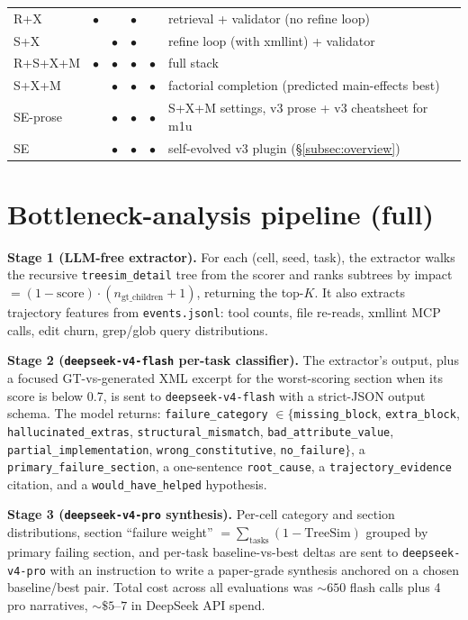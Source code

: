 \documentclass{article}
\begin{document}
\begin{table}[h]
\begin{tabular}{lccccl}
    R+X & $\bullet$ &         & $\bullet$ &         & retrieval + validator (no refine loop)                 \\
    S+X &         & $\bullet$ & $\bullet$ &         & refine loop (with xmllint) + validator                 \\
    R+S+X+M & $\bullet$ & $\bullet$ & $\bullet$ & $\bullet$ & full stack                                     \\
    \midrule
    S+X+M    &         & $\bullet$ & $\bullet$ & $\bullet$ & factorial completion (predicted main-effects best) \\
    SE-prose &         & $\bullet$ & $\bullet$ & $\bullet$ & S+X+M settings, v3 prose + v3 cheatsheet for m1u   \\
    SE       &         & $\bullet$ & $\bullet$ & $\bullet$ & self-evolved v3 plugin (\S\ref{subsec:overview})   \\
    \bottomrule
  \end{tabular}
\end{table}

\section{Bottleneck-analysis pipeline (full)}
\label{app:bottleneck}

\textbf{Stage 1 (LLM-free extractor).} For each (cell, seed, task), the extractor walks the recursive \texttt{treesim\_detail} tree from the scorer and ranks subtrees by impact $= (1 - \mathrm{score}) \cdot (n_{\mathrm{gt\_children}} + 1)$, returning the top-$K$. It also extracts trajectory features from \texttt{events.jsonl}: tool counts, file re-reads, xmllint MCP calls, edit churn, grep/glob query distributions.

\textbf{Stage 2 (\texttt{deepseek-v4-flash} per-task classifier).} The extractor's output, plus a focused GT-vs-generated XML excerpt for the worst-scoring section when its score is below 0.7, is sent to \texttt{deepseek-v4-flash} with a strict-JSON output schema. The model returns: \texttt{failure\_category} $\in \{$\texttt{missing\_block}, \texttt{extra\_block}, \texttt{hallucinated\_extras}, \texttt{structural\_mismatch}, \texttt{bad\_attribute\_value}, \texttt{partial\_implementation}, \texttt{wrong\_constitutive}, \texttt{no\_failure}$\}$, a \texttt{primary\_failure\_section}, a one-sentence \texttt{root\_cause}, a \texttt{trajectory\_evidence} citation, and a \texttt{would\_have\_helped} hypothesis.

\textbf{Stage 3 (\texttt{deepseek-v4-pro} synthesis).} Per-cell category and section distributions, section ``failure weight'' $= \sum_{\mathrm{tasks}}(1 - \mathrm{TreeSim})$ grouped by primary failing section, and per-task baseline-vs-best deltas are sent to \texttt{deepseek-v4-pro} with an instruction to write a paper-grade synthesis anchored on a chosen baseline/best pair. Total cost across all evaluations was ${\sim}650$ flash calls plus 4 pro narratives, ${\sim}\$5\text{--}7$ in DeepSeek API spend.
\end{document}
